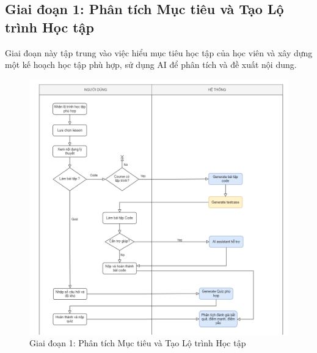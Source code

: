 \subsection{Giai đoạn 1: Phân tích Mục tiêu và Tạo Lộ trình Học tập}
Giai đoạn này tập trung vào việc hiểu mục tiêu học tập của học viên và xây dựng một kế hoạch học tập phù hợp, sử dụng AI để phân tích và đề xuất nội dung.
\begin{figure}[H]
    \centering
    \includegraphics[width=\linewidth]{Images/flowchart_1.png}
    \caption{Giai đoạn 1: Phân tích Mục tiêu và Tạo Lộ trình Học tập}
\end{figure}
